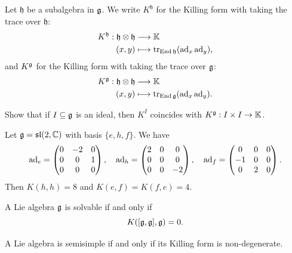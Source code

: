 \begin{remark}
  Let $\mathfrak{h}$ be a subalgebra in $\mathfrak{g}$.
  We write $K^{\mathfrak{h}}$ for
  the Killing form with
  taking the trace over $\mathfrak{h}$:
  \begin{align*}
    K^{\mathfrak{h}}
    : \mathfrak{h} \otimes \mathfrak{h}
    &\longrightarrow \mathbb{K} \\
    (x, y)
    &\longmapsto \operatorname{tr}_{\operatorname{End} \mathfrak{h}}(\operatorname{ad}_x \operatorname{ad}_y),
  \end{align*}
  and $K^{\mathfrak{g}}$ for the
  Killing form with
  taking the trace over $\mathfrak{g}$:
  \begin{align*}
    K^{\mathfrak{g}}
    : \mathfrak{h} \otimes \mathfrak{h}
    &\longrightarrow \mathbb{K} \\
    (x, y)
    &\longmapsto \operatorname{tr}_{\operatorname{End} \mathfrak{g}}(\operatorname{ad}_x \operatorname{ad}_y).
  \end{align*}
\end{remark}

\begin{exercise}
  Show that if $I \subseteq \mathfrak{g}$ is an ideal,
  then $K^I$ coincides with
  $K^{\mathfrak{g}} : I \times I \to \mathbb{K}$.
\end{exercise}

\begin{example}
  Let $\mathfrak{g} = \mathfrak{sl}(2, \mathbb{C})$ with
  basis $\{e, h, f\}$. We have
  \[
    \operatorname{ad}_e =
    \begin{pmatrix}
      0 & -2 & 0 \\
      0 & 0 & 1 \\
      0 & 0 & 0
    \end{pmatrix}, \quad
    \operatorname{ad}_h =
    \begin{pmatrix}
      2 & 0 & 0 \\
      0 & 0 & 0 \\
      0 & 0 & -2
    \end{pmatrix}, \quad
    \operatorname{ad}_f =
    \begin{pmatrix}
      0 & 0 & 0 \\
      -1 & 0 & 0 \\
      0 & 2 & 0
    \end{pmatrix}.
  \]
  Then $K(h, h) = 8$ and
  $K(e, f) = K(f, e) = 4$.
\end{example}

\begin{theorem}\label{thm:cartan-solvable}
  A Lie algebra $\mathfrak{g}$ is solvable
  if and only if
  \[K([\mathfrak{g}, \mathfrak{g}], \mathfrak{g}) = 0.\]
\end{theorem}

\begin{theorem}\label{thm:cartan-semisimple}
  A Lie algebra is semisimple
  if and only if its Killing form
  is non-degenerate.
\end{theorem}

